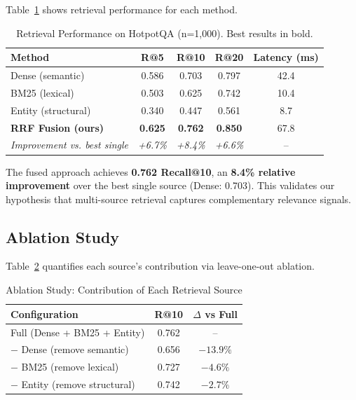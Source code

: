 \documentclass[11pt,a4paper]{article}
\begin{document}
Table~\ref{tab:main_results} shows retrieval performance for each method.

\begin{table}[h]
\centering
\caption{Retrieval Performance on HotpotQA (n=1,000). Best results in bold.}
\label{tab:main_results}
\begin{tabular}{lcccc}
\toprule
\textbf{Method} & \textbf{R@5} & \textbf{R@10} & \textbf{R@20} & \textbf{Latency (ms)} \\
\midrule
Dense (semantic) & 0.586 & 0.703 & 0.797 & 42.4 \\
BM25 (lexical) & 0.503 & 0.625 & 0.742 & 10.4 \\
Entity (structural) & 0.340 & 0.447 & 0.561 & 8.7 \\
\midrule
\textbf{RRF Fusion (ours)} & \textbf{0.625} & \textbf{0.762} & \textbf{0.850} & 67.8 \\
\midrule
\textit{Improvement vs. best single} & \textit{+6.7\%} & \textit{+8.4\%} & \textit{+6.6\%} & -- \\
\bottomrule
\end{tabular}
\end{table}

The fused approach achieves \textbf{0.762 Recall@10}, an \textbf{8.4\% relative improvement} over the best single source (Dense: 0.703). This validates our hypothesis that multi-source retrieval captures complementary relevance signals.

\subsection{Ablation Study}

Table~\ref{tab:ablation} quantifies each source's contribution via leave-one-out ablation.

\begin{table}[h]
\centering
\caption{Ablation Study: Contribution of Each Retrieval Source}
\label{tab:ablation}
\begin{tabular}{lcc}
\toprule
\textbf{Configuration} & \textbf{R@10} & \textbf{$\Delta$ vs Full} \\
\midrule
Full (Dense + BM25 + Entity) & 0.762 & -- \\
\midrule
$-$ Dense (remove semantic) & 0.656 & $-13.9\%$ \\
$-$ BM25 (remove lexical) & 0.727 & $-4.6\%$ \\
$-$ Entity (remove structural) & 0.742 & $-2.7\%$ \\
\bottomrule
\end{tabular}
\end{table}
\end{document}
